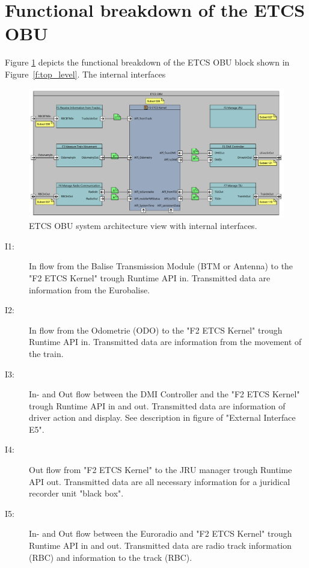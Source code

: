 \section{Functional breakdown of the ETCS OBU}

Figure \ref{f:ETCS_OBU_decomposition} depicts the functional breakdown of the ETCS OBU block shown in Figure~\ref{f:top_level}. The internal interfaces
\begin{figure}
\centering
\includegraphics[width=\textwidth]{images/F2_ETCS_Kernel.pdf}
\caption{ETCS OBU system architecture view with internal interfaces.}
\label{f:ETCS_OBU_decomposition}
\end{figure}
\begin{description}
\item[I1:] In flow from the Balise Transmission Module (BTM or Antenna) to the "F2 ETCS Kernel" trough Runtime API in. Transmitted data are information from the Eurobalise.

\item[I2:] In flow from the Odometrie (ODO) to the "F2 ETCS Kernel" trough Runtime API in. Transmitted data are information from the movement of the train.

\item[I3:] In- and Out flow between the DMI Controller and the "F2 ETCS Kernel" trough Runtime API in and out. Transmitted data are information of driver action and display. See description in figure of "External Interface E5".

\item[I4:] Out flow from "F2 ETCS Kernel" to the JRU manager trough Runtime API out. Transmitted data are all necessary information for a juridical recorder unit "black box".

\item[I5:] In- and Out flow between the Euroradio and "F2 ETCS Kernel" trough Runtime API in and out. Transmitted data are radio track information (RBC) and information to the track (RBC). 
\end{description}






